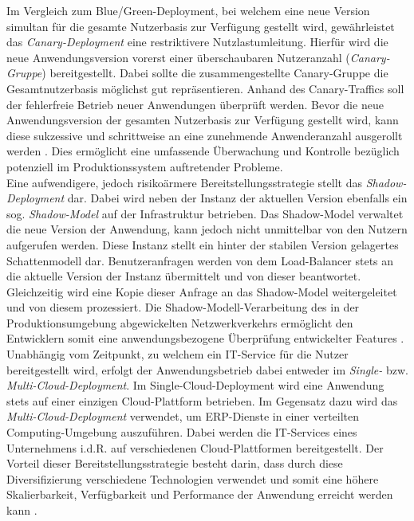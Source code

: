 \vspace*{-15mm}
Im Vergleich zum Blue/Green-Deployment, bei welchem eine neue Version simultan für die gesamte Nutzerbasis zur Verfügung gestellt wird, gewährleistet das \textit{Canary-Deployment} eine restriktivere Nutzlastumleitung. Hierfür wird die neue Anwendungsversion vorerst einer überschaubaren Nutzeranzahl (\textit{Canary-Gruppe}) bereitgestellt. Dabei sollte die zusammengestellte Canary-Gruppe die Gesamtnutzerbasis möglichst gut repräsentieren. Anhand des Canary-Traffics soll der fehlerfreie Betrieb neuer Anwendungen überprüft werden. Bevor die neue Anwendungsversion der gesamten Nutzerbasis zur Verfügung gestellt wird, kann diese sukzessive und schrittweise an eine zunehmende Anwenderanzahl ausgerollt werden \cite{Ugochi.20220503}. Dies ermöglicht eine umfassende Überwachung und Kontrolle bezüglich potenziell im Produktionssystem auftretender Probleme.\\ Eine aufwendigere, jedoch risikoärmere Bereitstellungsstrategie stellt das \textit{Shadow-Deployment} dar. Dabei wird neben der Instanz der aktuellen Version ebenfalls ein sog. \textit{Shadow-Model} auf der Infrastruktur betrieben. Das Shadow-Model verwaltet die neue Version der Anwendung, kann jedoch nicht unmittelbar von den Nutzern aufgerufen werden. Diese Instanz stellt ein hinter der stabilen Version gelagertes Schattenmodell dar. Benutzeranfragen werden von dem Load-Balancer stets an die aktuelle Version der Instanz übermittelt und von dieser beantwortet. Gleichzeitig wird eine Kopie dieser Anfrage an das Shadow-Model weitergeleitet und von diesem prozessiert. Die Shadow-Modell-Verarbeitung des in der Produktionsumgebung abgewickelten Netzwerkverkehrs ermöglicht den Entwicklern somit eine anwendungsbezogene Überprüfung entwickelter Features \cite{Ugochi.20220503}.\\ Unabhängig vom Zeitpunkt, zu welchem ein IT-Service für die Nutzer bereitgestellt 
  wird, erfolgt der Anwendungsbetrieb dabei entweder im \textit{Single-} bzw. \textit{Multi-Cloud-Deployment}. Im Single-Cloud-Deployment wird eine Anwendung stets auf einer einzigen Cloud-Plattform betrieben. Im Gegensatz dazu wird das \textit{Multi-Cloud-Deployment} verwendet, um ERP-Dienste in einer verteilten Computing-Umgebung auszuführen. Dabei werden die IT-Services eines Unternehmens i.d.R. auf verschiedenen Cloud-Plattformen bereitgestellt. Der Vorteil dieser Bereitstellungsstrategie besteht darin, dass durch diese Diversifizierung verschiedene Technologien verwendet und somit eine höhere Skalierbarkeit, Verfügbarkeit und Performance der Anwendung erreicht werden kann \cite{.20230419b}.